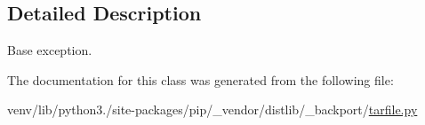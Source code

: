 \subsection{Detailed Description}
\begin{DoxyVerb}Base exception.\end{DoxyVerb}
 

The documentation for this class was generated from the following file\+:\begin{DoxyCompactItemize}
\item 
venv/lib/python3./site-\/packages/pip/\+\_\+vendor/distlib/\+\_\+backport/\hyperlink{tarfile_8py}{tarfile.\+py}\end{DoxyCompactItemize}
